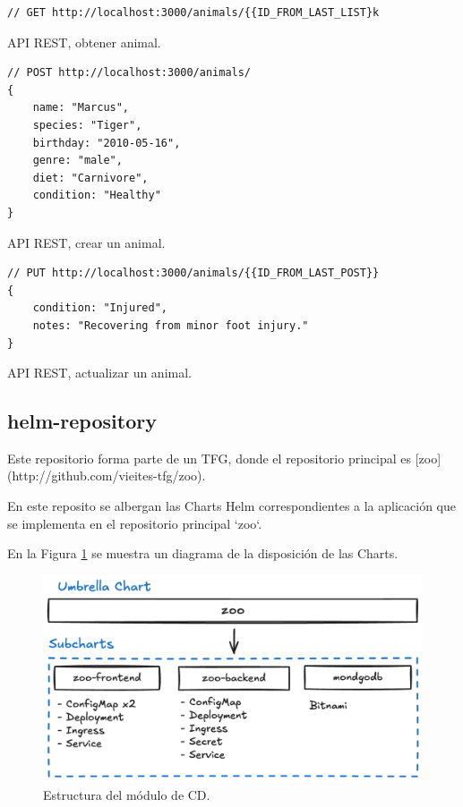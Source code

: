 \begin{listing}[!ht]
  \begin{verbatim}
// GET http://localhost:3000/animals/{{ID_FROM_LAST_LIST}k
  \end{verbatim}
  \caption{API REST, obtener animal.}
\end{listing}

\begin{listing}[!ht]
  \begin{verbatim}
// POST http://localhost:3000/animals/
{
    name: "Marcus",
    species: "Tiger",
    birthday: "2010-05-16",
    genre: "male",
    diet: "Carnivore",
    condition: "Healthy"
}
  \end{verbatim}
  \caption{API REST, crear un animal.}
\end{listing}

\begin{listing}[!ht]
  \begin{verbatim}
// PUT http://localhost:3000/animals/{{ID_FROM_LAST_POST}}
{
    condition: "Injured",
    notes: "Recovering from minor foot injury."
}
  \end{verbatim}
  \caption{API REST, actualizar un animal.}
\end{listing}

\subsection{helm-repository}

Este repositorio forma parte de un TFG, donde el repositorio principal es [zoo](http://github.com/vieites-tfg/zoo).

En este reposito se albergan las Charts Helm correspondientes a la aplicación que se implementa en el repositorio principal `zoo`.

En la Figura \ref{fig:charts_diagram} se muestra un diagrama de la disposición de las Charts.

\begin{figure}
  \centerline{\includegraphics[width=13.5cm]{figuras/charts_diagram}}
  \caption{Estructura del módulo de CD.}
  \label{fig:charts_diagram}
\end{figure}

